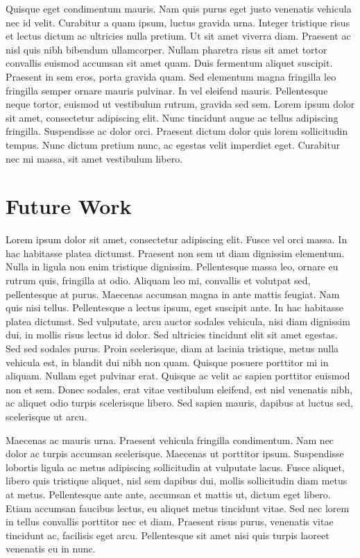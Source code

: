 \documentclass[botnum,fleqn,final]{unmeethesis}
\begin{document}
Quisque eget condimentum mauris. Nam quis purus eget justo venenatis vehicula
nec id velit. Curabitur a quam ipsum, luctus gravida urna. Integer tristique
risus et lectus dictum ac ultricies nulla pretium. Ut sit amet viverra diam.
Praesent ac nisl quis nibh bibendum ullamcorper. Nullam pharetra risus sit amet
tortor convallis euismod accumsan sit amet quam. Duis fermentum aliquet
suscipit. Praesent in sem eros, porta gravida quam. Sed elementum magna
fringilla leo fringilla semper ornare mauris pulvinar. In vel eleifend mauris.
Pellentesque neque tortor, euismod ut vestibulum rutrum, gravida sed sem. Lorem
ipsum dolor sit amet, consectetur adipiscing elit. Nunc tincidunt augue ac
tellus adipiscing fringilla. Suspendisse ac dolor orci. Praesent dictum dolor
quis lorem sollicitudin tempus. Nunc dictum pretium nunc, ac egestas velit
imperdiet eget. Curabitur nec mi massa, sit amet vestibulum libero.

\chapter{\label{chapter:fw}Future Work}

Lorem ipsum dolor sit amet, consectetur adipiscing elit. Fusce vel orci massa.
In hac habitasse platea dictumst. Praesent non sem ut diam dignissim elementum.
Nulla in ligula non enim tristique dignissim. Pellentesque massa leo, ornare eu
rutrum quis, fringilla at odio. Aliquam leo mi, convallis et volutpat sed,
pellentesque at purus. Maecenas accumsan magna in ante mattis feugiat. Nam quis
nisi tellus. Pellentesque a lectus ipsum, eget suscipit ante. In hac habitasse
platea dictumst. Sed vulputate, arcu auctor sodales vehicula, nisi diam
dignissim dui, in mollis risus lectus id dolor. Sed ultricies tincidunt elit
sit amet egestas. Sed sed sodales purus. Proin scelerisque, diam at lacinia
tristique, metus nulla vehicula est, in blandit dui nibh non quam. Quisque
posuere porttitor mi in aliquam. Nullam eget pulvinar erat. Quisque ac velit ac
sapien porttitor euismod non et sem. Donec sodales, erat vitae vestibulum
eleifend, est nisl venenatis nibh, ac aliquet odio turpis scelerisque libero.
Sed sapien mauris, dapibus at luctus sed, scelerisque ut arcu.

Maecenas ac mauris urna. Praesent vehicula fringilla condimentum. Nam nec dolor
ac turpis accumsan scelerisque. Maecenas ut porttitor ipsum. Suspendisse
lobortis ligula ac metus adipiscing sollicitudin at vulputate lacus. Fusce
aliquet, libero quis tristique aliquet, nisl sem dapibus dui, mollis
sollicitudin diam metus at metus. Pellentesque ante ante, accumsan et mattis
ut, dictum eget libero. Etiam accumsan faucibus lectus, eu aliquet metus
tincidunt vitae. Sed nec lorem in tellus convallis porttitor nec et diam.
Praesent risus purus, venenatis vitae tincidunt ac, facilisis eget arcu.
Pellentesque sit amet nisi quis turpis laoreet venenatis eu in nunc.
\end{document}
